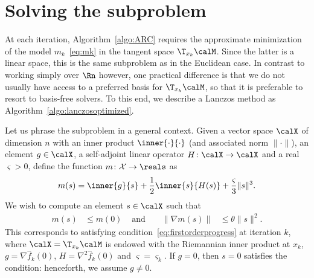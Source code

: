 

\section{Solving the subproblem} \label{sec:subproblem}



At each iteration, Algorithm~\ref{algo:ARC} requires the approximate minimization of the model $m_k$~\eqref{eq:mk} in the tangent space $\T_{x_k}\calM$. Since the latter is a linear space, this is the same subproblem as in the Euclidean case. In contrast to working simply over $\Rn$ however, one practical difference is that we do not usually have access to a preferred basis for $\T_{x_k}\calM$, so that it is preferable to resort to basis-free solvers. To this end, we describe a Lanczos method as Algorithm~\ref{algo:lanczosoptimized}.

Let us phrase the subproblem in a general context. Given a vector space $\calX$ of dimension $n$ with an inner product $\inner{\cdot}{\cdot}$ (and associated norm $\|\cdot\|$), an element $g \in \calX$, a self-adjoint linear operator $H \colon \calX \rightarrow \calX$ and a real $\varsigma > 0$, define the function $m\colon\mathcal{X} \rightarrow \reals$ as 
\begin{align}
	m(s) = \inner{g}{s} + \frac{1}{2}\inner{s}{H(s)} + \frac{\varsigma}{3}\|s\|^3. 	
	\label{eqn:modelfunctionm}
\end{align}
We wish to compute an element $s \in \calX$ such that
\begin{align}
	m(s) & \leq m(0) & \textrm{ and } & & \|\nabla m(s)\| & \leq \theta \|s\|^2.
	\label{eqn:subsolvercondition}
\end{align}
This corresponds to satisfying condition~\eqref{eq:firstorderprogress}
at iteration $k$, where $\calX = \T_{x_k}\calM$ is endowed with the Riemannian inner product at $x_k$, $g = \nabla \hat f_k(0)$, $H = \nabla^2 \hat f_k(0)$ and $\varsigma = \varsigma_k$. If $g = 0$, then $s = 0$ satisfies the condition: henceforth, we assume $g \neq 0$.

